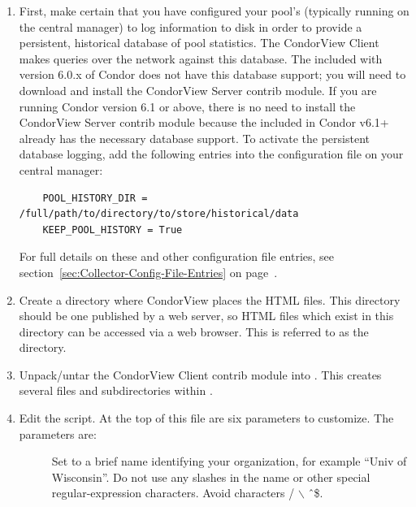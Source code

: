 \begin{enumerate}

\item First, make certain that you have configured your pool's
 (typically running on the central manager) to log
information to disk in order to provide a persistent, historical
database of pool statistics.  
The CondorView Client makes queries over the network against this
database.  The  included with version 6.0.x of Condor
does not have this database support; you will need to download and
install the CondorView Server contrib module.  
If you are running Condor
version 6.1 or above, there is no need to install the CondorView Server
contrib module because the  included in Condor v6.1+
already has the necessary database support.  
To activate the persistent database logging, add the following entries into
the configuration file on your central manager: 
\begin{verbatim}
    POOL_HISTORY_DIR = /full/path/to/directory/to/store/historical/data 
    KEEP_POOL_HISTORY = True 
\end{verbatim}
For full details on these and other  configuration file
entries, see section~\ref{sec:Collector-Config-File-Entries} on
page~\pageref{sec:Collector-Config-File-Entries}.

\item Create a directory where CondorView places the
HTML files.  
This directory should be one published by a web server, so HTML
files which exist in this directory can be accessed via a web browser.  
This is referred to as the  directory.

\item Unpack/untar the CondorView Client contrib module into .
This creates several files and subdirectories within .

\item Edit the \MakeStats script.  At the top of this file are six parameters
to customize.  The parameters are:

        \begin{description}

	\item[] Set to a brief name identifying
	your organization, for example ``Univ of Wisconsin''.  Do not
	use any slashes in the name or other special regular-expression
	characters. Avoid characters / $\backslash$ \^\ \$.


\end{description}
\end{enumerate}
